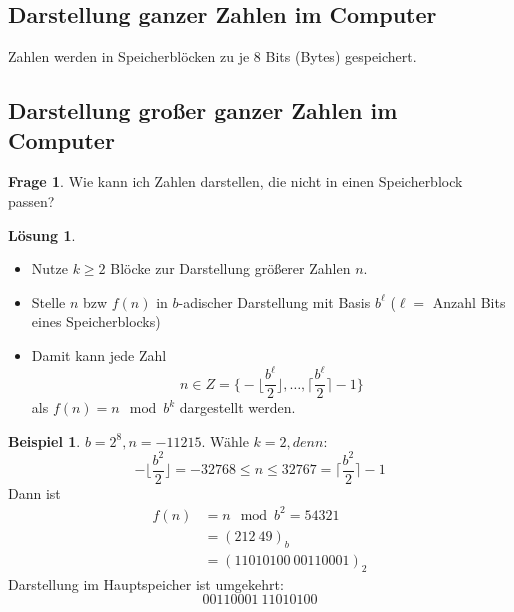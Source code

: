 \documentclass[a4paper,12pt]{article}
\theoremstyle{definition}
\newtheorem*{example}{Beispiel}
\newtheorem*{frage}{Frage}
\newtheorem*{loesung}{Lösung}
\begin{document}
	\subsection{Darstellung ganzer Zahlen im Computer}
	Zahlen werden in Speicherblöcken zu je $8$ Bits (\glqq Bytes\grqq) gespeichert. 
	\subsection{Darstellung großer ganzer Zahlen im Computer}
	\begin{frage}
		Wie kann ich Zahlen darstellen, die nicht in einen Speicherblock passen?
	\end{frage}
	\begin{loesung}
		\begin{itemize}
			\item Nutze $k \geq 2$ Blöcke zur Darstellung größerer Zahlen $n$.
			\item Stelle $n$ bzw $f(n)$ in $b$-adischer Darstellung mit Basis $b^\ell$ ($\ell =$ Anzahl Bits eines Speicherblocks)
			\item Damit kann jede Zahl 
			\[
				n \in Z = \bigg\{-\bigg\lfloor \frac{b^\ell}{2}\bigg\rfloor, \ldots, \bigg\lceil \frac{b^\ell}{2}\bigg\rceil - 1\bigg\}
			\]
			als $f(n) = n \mod b^k$ dargestellt werden.
		\end{itemize}
	\end{loesung}
	\begin{example}
		$b = 2^8, n = -11215$. Wähle $k = 2, denn:$
		\[
			-\bigg\lfloor \frac{b^2}{2} \bigg\rfloor = -32768 \leq n \leq 32767 = \bigg\lceil \frac{b^2}{2} \bigg\rceil - 1
		\]
		Dann ist
		\begin{align*}
			f(n) &= n \mod b^2 = 54321\\
			&= (212~49)_b\\
			&= (11010100~00110001)_2
		\end{align*}
		Darstellung im Hauptspeicher ist umgekehrt:
		\[00110001~11010100\]
	\end{example}
\end{document}
